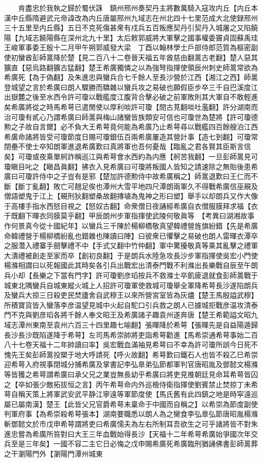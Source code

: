　　肯盡忠於我執之歸於蜀伏誅　鎮州邢州奏契丹主將數萬騎入寇攻内丘【内丘本漢中丘縣隋避武元帝諱改為内丘唐屬邢州九域志在州北四十七里范成大北使録邢州三十五里至内丘縣】五日不克死傷甚衆有戍兵五百叛應契丹引契丹入城屠之又陷饒陽【九域志饒陽縣在深州北九十里】太后敕郭威將大軍擊之國事權委竇貞固蘇禹珪王峻軍事委王殷十二月甲午朔郭威發大梁　丁酉以翰林學士戶部侍郎范質為樞密副使初蠻酋彭師暠降於楚【見二百八十二卷晉天福五年酋慈由翻暠古老翻】楚人惡其獷直【惡烏路翻獷古猛翻】楚王希廣獨憐之以為強弩指揮使領辰州刺史師暠常欲為希廣死【為于偽翻】及朱進忠與蠻兵合七千餘人至長沙營於江西【湘江之西】師暠登城望之言於希廣曰朗人驟勝而驕雜以蠻兵攻之易破也願假臣步卒三千自巴溪度江出嶽麓之後至水西令許可瓊以戰艦度江腹背合擊必破之前軍敗則其大軍自不敢輕進矣希廣將從之時馬希萼已遣閒使以厚利啖許可瓊【間古莧翻啖吐濫翻】許分湖南而治可瓊有貳心乃謂希廣曰師暠與梅山諸蠻皆族類安可信也可瓊世為楚將【許可瓊德勲之子故自言爾】必不負大王希萼竟何能為希廣乃止希萼尋以戰艦四百餘艘泊江西希廣命諸將皆受可瓊節度日賜可瓊銀伍百兩希廣屢造其營計事【造七到翻】可瓊常閉壘不使士卒知朗軍進退希廣歎曰真將軍也吾何憂哉【臨亂之君各賢其臣斯言信矣】可瓊或夜乘單舸詐稱巡江與希萼會水西約為内應【舸苦我翻】一旦彭師暠見可瓊瞋目叱之【瞋昌眞翻】拂衣入見希廣曰可瓊將叛國人皆知之請速除之無貽後患希廣曰可瓊許侍中之子豈有是邪【楚加許德勲侍中故希廣稱之】師暠退歎曰王仁而不斷【斷丁亂翻】敗亡可翹足俟也潭州大雪平地四尺潭朗兩軍久不得戰希廣信巫覡及僧語塑鬼于江上【覡刑狄翻塑桑故翻摶埴為鬼神之形曰塑】舉手以却朗兵又作大像于高樓手指水西怒目視之【怒奴古翻】命衆僧日夜誦經希廣自衣僧服膜拜求福【衣于既翻下暉衣同膜莫乎翻】甲辰朗州步軍指揮使武陵何敬眞等　【考異曰湖湘故事作何景真今從十國紀年】以蠻兵三千陳於楊柳橋敬真望韓禮營旌旗紛錯【先是希廣命韓禮營于楊柳橋紛亂也錯雜也陳讀曰陣】曰彼衆已懼擊之易破也朗人雷暉衣潭卒之服濳入禮寨手劒擊禮不中【手式又翻中竹仲翻】軍中驚擾敬真等乘其亂擊之禮軍大潰禮被創走至家而卒【創初良翻】于是朗兵水陸急攻長沙步軍指揮使吳宏小門使楊滌相謂曰以死報國此其時矣各引兵出戰宏出清泰門戰不利滌出長樂戰自辰至午朗兵小却【長樂之下當有門字】許可瓊劉彦瑫按兵不救滌士卒飢疲退就食彭師暠戰于城東北隅蠻兵自城東縱火城上人招許可瓊軍使救城可瓊舉全軍降希萼長沙遂陷朗兵及蠻兵大掠三日殺吏民焚廬舍自武穆王以來所營宮室皆為灰燼【楚王馬殷謚武穆】所積寶貨皆入蠻落李彦温望見城中火起自駝口引兵救之朗人已據城拒戰彦温攻清泰門不克與劉彦瑫各將千餘人奉文昭王及希廣諸子趣袁州遂奔唐【楚王希範謚文昭九域志潭州東南至袁州六百三十四里趣七喻翻】張暉降於希萼【張暉先是自益陽遁歸長沙長沙既陷遂降于希萼】左司馬希崇帥將吏詣希萼勸進【馬希崇通希萼事始二百八十七卷天福十二年帥讀曰率】吳宏戰血滿袖見希萼曰不幸為許可瓊所誤今日死不愧先王矣彭師暠投槊于地大呼請死【呼火故翻】希萼歎曰鐵石人也皆不殺乙巳希崇迎希萼入府視事閉城分捕希廣及掌書記李弘臯弟弘節都軍判官唐昭胤及鄧懿文楊滌等皆獲之希萼謂希廣曰承父兄之業豈無長幼乎希廣曰將吏見推朝廷見命耳希萼皆囚之【卒如張少敵拓拔恒之言】丙午希萼命内外巡檢侍衛指揮使劉賓禁止焚掠丁未希萼自稱天策上將軍武安武平静江寧遠等軍節度使【馬氏舊有此四鎮之地是時寜遠巡屬已屬南漢】楚王【此皆父兄官爵希萼未稟命于中國而自稱之】以希崇為節度副使判軍府事【為希崇殺希萼張本】湖南要職悉以朗人為之臠食李弘臯弘節唐昭胤楊滌斬鄧懿文於市戊申希萼謂將吏曰希廣懦夫為左右所制耳吾欲生之可乎諸將皆不對朱進忠嘗為希廣所笞對曰大王三年血戰始得長沙【天福十二年希萼希廣始爭國次年交兵至是三年矣】一國不容二主它日必悔之戊申賜希廣死希廣臨刑猶誦佛書彭師暠葬之干瀏陽門外【瀏陽門潭州城東